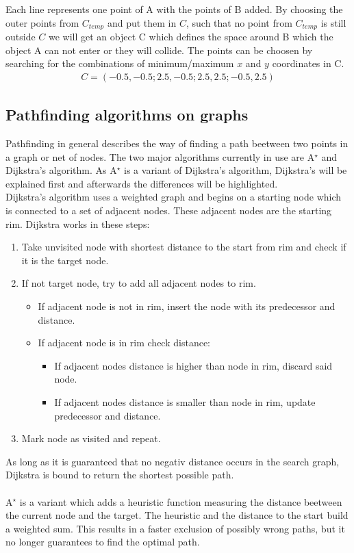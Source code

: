 Each line represents one point of A with the points of B added. By choosing the outer points from $C_{temp}$ and put them in $C$, such that no point from $C_{temp}$ is still outside $C$  we will get an object C which defines the space around B which the object A can not enter or they will collide. The points can be choosen by searching for the combinations of minimum/maximum $x$ and $y$ coordinates in C.
\begin{align*}
C = (-0.5, -0.5; 2.5, -0.5; 2.5, 2.5; -0.5, 2.5)
\end{align*}

\subsection{Pathfinding algorithms on graphs}
Pathfinding in general describes the way of finding a path beetween two points in a graph or net of nodes. The two major algorithms currently in use are A$^\star$ and Dijkstra's algorithm. As A$^\star$ is a variant of Dijkstra's algorithm, Dijkstra's will be explained first and afterwards the differences will be highlighted.\\
Dijkstra's algorithm uses a weighted graph and begins on a starting node which is connected to a set of adjacent nodes. These adjacent nodes are the starting rim.
Dijkstra works in these steps:
\begin{enumerate}
\item Take unvisited node with shortest distance to the start from rim and check if it is the target node.
\item If not target node, try to add all adjacent nodes to rim.
\begin{itemize}
\item If adjacent node is not in rim, insert the node with its predecessor and distance.
\item If adjacent node is in rim check distance:
\begin{itemize}
\item If adjacent nodes distance is higher than node in rim, discard said node.
\item If adjacent nodes distance is smaller than node in rim, update predecessor and distance.
\end{itemize}
\end{itemize}
\item Mark node as visited and repeat.
\end{enumerate} 
As long as it is guaranteed that no negativ distance occurs in the search graph, Dijkstra is bound to return the shortest possible path.\\\\
A$^\star$ is a variant which adds a heuristic function measuring the distance beetween the current node and the target. The heuristic and the distance to the start build a weighted sum. This results in a faster exclusion of possibly wrong paths, but it no longer guarantees to find the optimal path.